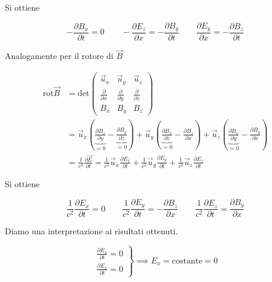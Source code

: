 Si ottiene

\begin{equation}
	\boxed{-\frac{\partial B_x}{\partial t} = 0 \qquad - \frac{\partial E_z}{\partial x} = - \frac{\partial B_y}{\partial t} \qquad \frac{\partial E_y}{\partial x} = - \frac{\partial B_z}{\partial t}}
	\label{eq:componenti1}
\end{equation}

Analogamente per il rotore di $\vec{B}$

\begin{equation*}
	\begin{aligned}
		\text{rot}\vec{B} &= \text{det} \begin{pmatrix}
		\vec{u}_x & \vec{u}_y & \vec{u}_z \\
		\frac{\partial}{\partial x}  &  \frac{\partial}{\partial y} & \frac{\partial}{\partial z} \\
		B_x & B_y & B_z
	\end{pmatrix} \\
	&= \vec{u}_x\left( \underbrace{\frac{\partial B_z}{\partial y}}_{=0} - \underbrace{\frac{\partial B_y}{\partial z}}_{=0}  \right) + \vec{u}_y \left( \underbrace{\frac{\partial B_x}{\partial z}}_{=0} - \frac{\partial B_z}{\partial x}  \right) + \vec{u}_z \left( \underbrace{\frac{\partial B_x}{\partial y}}_{=0} - \frac{\partial B_y}{\partial x}  \right)  \\
	&= \frac{1}{c^2}\frac{\partial \vec{E}}{\partial t} = \frac{1}{c^2} \vec{u}_x\frac{\partial E_x}{\partial t} + \frac{1}{c^2} \vec{u}_y\frac{\partial E_y}{\partial t} + \frac{1}{c^2} \vec{u}_z\frac{\partial E_z}{\partial t}
	\end{aligned}
\end{equation*}

Si ottiene

\begin{equation}
	\boxed{\frac{1}{c^2} \frac{\partial E_x}{\partial t} = 0 \qquad \frac{1}{c^2}\frac{\partial E_y}{\partial t} = - \frac{\partial B_z}{\partial x} \qquad \frac{1}{c^2} \frac{\partial E_z}{\partial t} = \frac{\partial B_y}{\partial x}}
	\label{eq:componenti2}
\end{equation}

Diamo una interpretazione ai risultati ottenuti.

\[
	\left. \begin{array}{r}
	 	\frac{\partial E_x}{\partial t} = 0 \\
		\frac{\partial E_x}{\partial t} = 0
	\end{array} \right\} \implies E_x = \text{costante} = 0
\]

